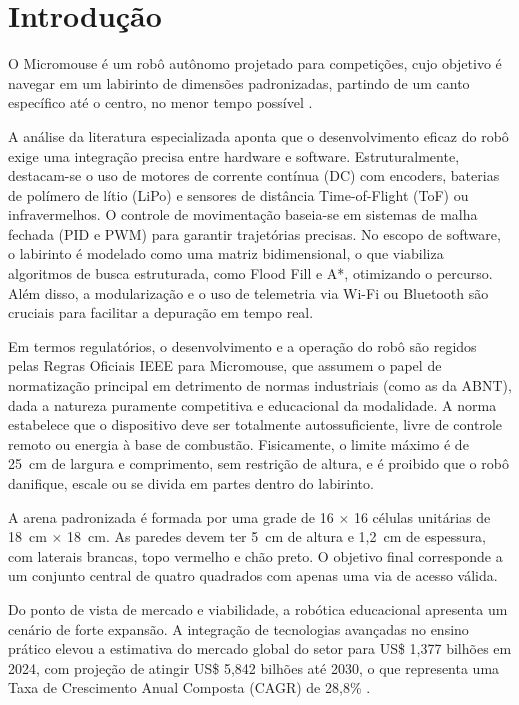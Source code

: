 \chapter[Introdução]{Introdução}

O Micromouse é um robô autônomo projetado para competições, cujo objetivo é navegar em um labirinto de dimensões padronizadas, partindo de um canto específico até o centro, no menor tempo possível \cite{ieee2023}.

A análise da literatura especializada aponta que o desenvolvimento eficaz do robô exige uma integração precisa entre hardware e software. Estruturalmente, destacam-se o uso de motores de corrente contínua (DC) com encoders, baterias de polímero de lítio (LiPo) e sensores de distância Time-of-Flight (ToF) ou infravermelhos. O controle de movimentação baseia-se em sistemas de malha fechada (PID e PWM) para garantir trajetórias precisas. No escopo de software, o labirinto é modelado como uma matriz bidimensional, o que viabiliza algoritmos de busca estruturada, como Flood Fill e A*, otimizando o percurso. Além disso, a modularização e o uso de telemetria via Wi-Fi ou Bluetooth são cruciais para facilitar a depuração em tempo real.

Em termos regulatórios, o desenvolvimento e a operação do robô são regidos pelas Regras Oficiais IEEE para Micromouse, que assumem o papel de normatização principal em detrimento de normas industriais (como as da ABNT), dada a natureza puramente competitiva e educacional da modalidade. A norma estabelece que o dispositivo deve ser totalmente autossuficiente, livre de controle remoto ou energia à base de combustão. Fisicamente, o limite máximo é de 25~cm de largura e comprimento, sem restrição de altura, e é proibido que o robô danifique, escale ou se divida em partes dentro do labirinto.

A arena padronizada é formada por uma grade de 16 $\times$ 16 células unitárias de 18~cm $\times$ 18~cm. As paredes devem ter 5~cm de altura e 1,2~cm de espessura, com laterais brancas, topo vermelho e chão preto. O objetivo final corresponde a um conjunto central de quatro quadrados com apenas uma via de acesso válida.

Do ponto de vista de mercado e viabilidade, a robótica educacional apresenta um cenário de forte expansão. A integração de tecnologias avançadas no ensino prático elevou a estimativa do mercado global do setor para US\$ 1,377 bilhões em 2024, com projeção de atingir US\$ 5,842 bilhões até 2030, o que representa uma Taxa de Crescimento Anual Composta (CAGR) de 28,8\% \cite{grandviewresearch2024}. 

